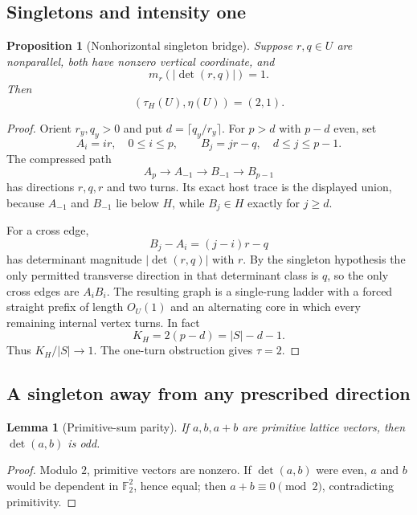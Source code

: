 \documentclass[11pt]{article}
\newtheorem{proposition}[theorem]{Proposition}
\newtheorem{lemma}[theorem]{Lemma}
\theoremstyle{definition}
\begin{document}
\subsection{Singletons and intensity one}
\begin{proposition}[Nonhorizontal singleton bridge]\label{prop:nonhorizontal-singleton}
Suppose $r,q\in U$ are nonparallel, both have nonzero vertical coordinate, and
\[
m_r(|\det(r,q)|)=1.
\]
Then
\[
\boxed{(\tau_H(U),\eta(U))=(2,1).}
\]
\end{proposition}
\begin{proof}
Orient $r_y,q_y>0$ and put $d=\lceil q_y/r_y\rceil$.  For $p>d$ with $p-d$ even, set
\[
A_i=ir,\quad0\le i\le p,
\qquad
B_j=jr-q,\quad d\le j\le p-1.
\]
The compressed path
\[
A_p\to A_{-1}\to B_{-1}\to B_{p-1}
\]
has directions $r,q,r$ and two turns.  Its exact host trace is the displayed union, because $A_{-1}$ and $B_{-1}$ lie below $H$, while $B_j\in H$ exactly for $j\ge d$.

For a cross edge,
\[
B_j-A_i=(j-i)r-q
\]
has determinant magnitude $|\det(r,q)|$ with $r$.  By the singleton hypothesis the only permitted transverse direction in that determinant class is $q$, so the only cross edges are $A_iB_i$.  The resulting graph is a single-rung ladder with a forced straight prefix of length $O_U(1)$ and an alternating core in which every remaining internal vertex turns.  In fact
\[
K_H=2(p-d)=|S|-d-1.
\]
Thus $K_H/|S|\to1$.  The one-turn obstruction gives $\tau=2$.
\end{proof}

\subsection{A singleton away from any prescribed direction}
\begin{lemma}[Primitive-sum parity]\label{lem:parity}
If $a,b,a+b$ are primitive lattice vectors, then $\det(a,b)$ is odd.
\end{lemma}
\begin{proof}
Modulo $2$, primitive vectors are nonzero.  If $\det(a,b)$ were even, $a$ and $b$ would be dependent in $\mathbb F_2^2$, hence equal; then $a+b\equiv0\pmod2$, contradicting primitivity.
\end{proof}
\end{document}
